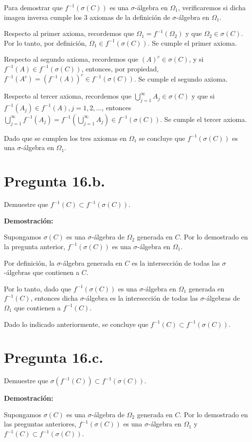 \documentclass[11pt]{article}
\begin{document}
Para demostrar que $\mathit{f}^{-1}(\sigma(C))$ es una $\sigma$-álgebra en $\Omega_{1}$, verificaremos si dicha imagen inversa cumple los 3 axiomas de la definición de $\sigma$-álgebra en $\Omega_{1}$. 

Respecto al primer axioma, recordemos que $\Omega_{1} = \mathit{f}^{-1}(\Omega_{2})$ y que $\Omega_{2} \in \sigma(C)$. Por lo tanto, por definición, $\Omega_{1} \in \mathit{f}^{-1}(\sigma(C))$. Se cumple el primer axioma.

Respecto al segundo axioma, recordemos que $(\mathit{A})^{c} \in \sigma(C)$, y si $\mathit{f}^{-1}(A) \in \mathit{f}^{-1}(\sigma(C))$, entonces, por propiedad, $\mathit{f}^{-1}(A^{c}) = (\mathit{f}^{-1}(A))^{c} \in \mathit{f}^{-1}(\sigma(C))$. Se cumple el segundo axioma.

Respecto al tercer axioma, recordemos que $\bigcup^{\infty}_{j=1} A_{j} \in \sigma(C)$ y que si $\mathit{f}^{-1}(A_{j}) \in \mathit{f}^{-1}(A), j=1,2, ... $, entonces $\bigcup_{j=1}^{\infty} \mathit{f}^{-1}(A_j) = \mathit{f}^{-1}(\bigcup_{j=1}^{\infty}A_j) \in \mathit{f}^{-1}(\sigma(C))$. Se cumple el tercer axioma.

Dado que se cumplen los tres axiomas en $\Omega_{1}$ se concluye que $\mathit{f}^{-1} (\sigma(C))$ es una $\sigma$-álgebra en $\Omega_{1}$.

\section{Pregunta 16.b.}

Demuestre que $\mathit{f}^{-1} (C) \subset \mathit{f}^{-1} (\sigma(C))$.

\textbf{Demostración:}

Supongamos $\sigma(C)$ es una $\sigma$-álgebra de $\Omega_2$ generada en $C$. Por lo demostrado en la pregunta anterior, $\mathit{f}^{-1} (\sigma(C))$ es una $\sigma$-álgebra en $\Omega_{1}$.

Por definición, la $\sigma$-álgebra generada en $C$ es la intersección de todas las $\sigma$-álgebras que contienen a $C$. 

Por lo tanto, dado que $\mathit{f}^{-1} (\sigma(C))$ es una $\sigma$-álgebra en $\Omega_{1}$ generada en $\mathit{f}^{-1}(C)$, entonces dicha $\sigma$-álgebra es la intersección de todas las $\sigma$-álgebras de $\Omega_{1}$ que contienen a $\mathit{f}^{-1}(C)$.

Dado lo indicado anteriormente, se concluye que $\mathit{f}^{-1} (C) \subset \mathit{f}^{-1} (\sigma(C))$.

\section{Pregunta 16.c.}

Demuestre que $\sigma(\mathit{f}^{-1}(C)) \subset \mathit{f}^{-1}(\sigma(C))$.

\textbf{Demostración:}

Supongamos $\sigma(C)$ es una $\sigma$-álgebra de $\Omega_2$ generada en $C$. Por lo demostrado en las preguntas anteriores, $\mathit{f}^{-1} (\sigma(C))$ es una $\sigma$-álgebra en $\Omega_{1}$ y $\mathit{f}^{-1} (C) \subset \mathit{f}^{-1} (\sigma(C))$.
\end{document}
